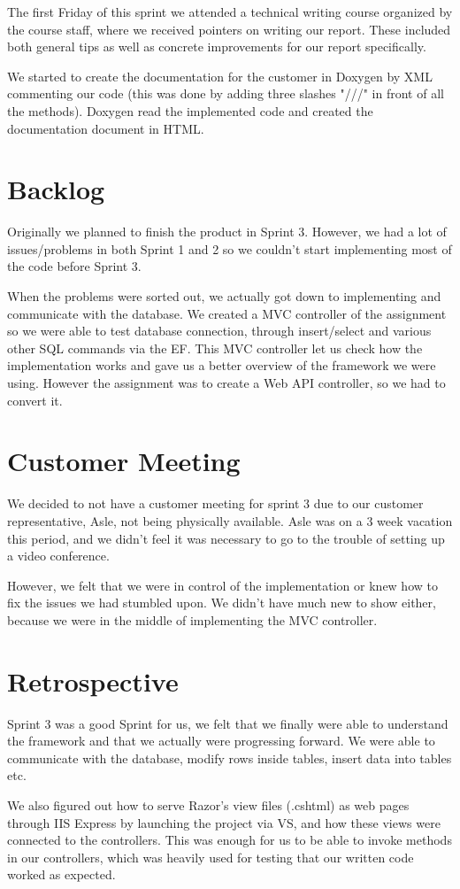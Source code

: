 The first Friday of this sprint we attended a technical writing course organized by the course staff, where we received pointers on writing our report. These included both general tips as well as concrete improvements for our report specifically.

We started to create the documentation for the customer in Doxygen by XML commenting our code (this was done by adding three slashes "///" in front of all the methods). Doxygen read the implemented code and created the documentation document in HTML. 

\section{Backlog}
Originally we planned to finish the product in Sprint 3. However, we had a lot of issues/problems in both Sprint 1 and 2 so we couldn't start implementing most of the code before Sprint 3.

When the problems were sorted out, we actually got down to implementing and communicate with the database. We created a MVC controller of the assignment so we were able to test database connection, through insert/select and various other SQL commands via the EF. This MVC controller let us check how the implementation works and gave us a better overview of the framework we were using. However the assignment was to create a Web API controller, so we had to convert it.

\section{Customer Meeting}
We decided to not have a customer meeting for sprint 3 due to our customer representative, Asle, not being physically available. Asle was on a 3 week vacation this period, and we didn't feel it was necessary to go to the trouble of setting up a video conference.

However, we felt that we were in control of the implementation or knew how to fix the issues we had stumbled upon. We didn't have much new to show either, because we were in the middle of implementing the MVC controller.

\section{Retrospective}
Sprint 3 was a good Sprint for us, we felt that we finally were able to understand the framework and that we actually were progressing forward. We were able to communicate with the database, modify rows inside tables, insert data into tables etc.

We also figured out how to serve Razor's view files (.cshtml) as web pages through IIS Express by launching the project via VS, and how these views were connected to the controllers. This was enough for us to be able to invoke methods in our controllers, which was heavily used for testing that our written code worked as expected.